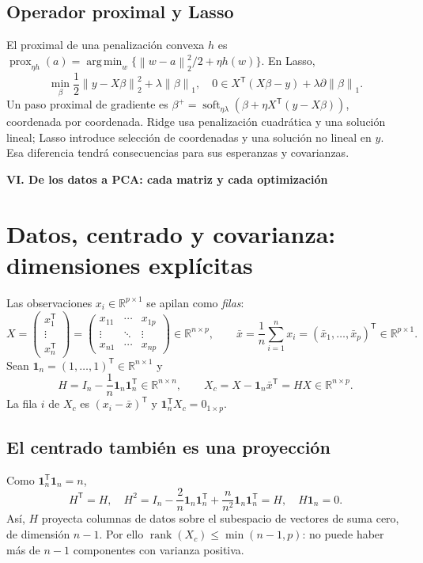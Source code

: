 \documentclass[11pt,a4paper]{article}
\newcommand{\R}{\mathbb R}
\newcommand{\T}{^{\mathsf T}}
\newcommand{\norm}[1]{\left\lVert #1\right\rVert}
\DeclareMathOperator*{\argmin}{arg\,min}
\DeclareMathOperator{\rank}{rank}
\newcommand{\ones}{\mathbf 1}
\theoremstyle{definition}
\newcommand{\parte}[1]{\par\bigskip\Needspace{8\baselineskip}\begin{center}{\Large\bfseries\color{azul}#1}\end{center}}
\begin{document}
\subsection{Operador proximal y Lasso}
El proximal de una penalización convexa $h$ es $\operatorname{prox}_{\eta h}(a)=\argmin_w\{\norm{w-a}_2^2/2+\eta h(w)\}$. En Lasso,
\[
\min_\beta\frac12\norm{y-X\beta}_2^2+\lambda\norm\beta_1,
\quad 0\in X\T(X\beta-y)+\lambda\partial\norm\beta_1.
\]
Un paso proximal de gradiente es $\beta^+=\operatorname{soft}_{\eta\lambda}(\beta+\eta X\T(y-X\beta))$, coordenada por coordenada. Ridge usa penalización cuadrática y una solución lineal; Lasso introduce selección de coordenadas y una solución no lineal en $y$. Esa diferencia tendrá consecuencias para sus esperanzas y covarianzas.

\parte{VI. De los datos a PCA: cada matriz y cada optimización}
\section{Datos, centrado y covarianza: dimensiones explícitas}
Las observaciones $x_i\in\R^{p\times1}$ se apilan como \emph{filas}:
\[
X=\begin{pmatrix}x_1\T\\\vdots\\x_n\T\end{pmatrix}
=\begin{pmatrix}x_{11}&\cdots&x_{1p}\\\vdots&\ddots&\vdots\\x_{n1}&\cdots&x_{np}\end{pmatrix}\in\R^{n\times p},\qquad
\bar x=\frac1n\sum_{i=1}^nx_i=(\bar x_1,\ldots,\bar x_p)\T\in\R^{p\times1}.
\]
Sean $\ones_n=(1,\ldots,1)\T\in\R^{n\times1}$ y
\[
H=I_n-\frac1n\ones_n\ones_n\T\in\R^{n\times n},\qquad
X_c=X-\ones_n\bar x\T=HX\in\R^{n\times p}.
\]
La fila $i$ de $X_c$ es $(x_i-\bar x)\T$ y $\ones_n\T X_c=0_{1\times p}$.
\subsection{El centrado también es una proyección}
Como $\ones_n\T\ones_n=n$,
\[
H\T=H,\quad H^2=I_n-\frac2n\ones_n\ones_n\T+\frac{n}{n^2}\ones_n\ones_n\T=H,
\quad H\ones_n=0.
\]
Así, $H$ proyecta columnas de datos sobre el subespacio de vectores de suma cero, de dimensión $n-1$. Por ello $\rank(X_c)\le\min(n-1,p)$: no puede haber más de $n-1$ componentes con varianza positiva.
\end{document}
